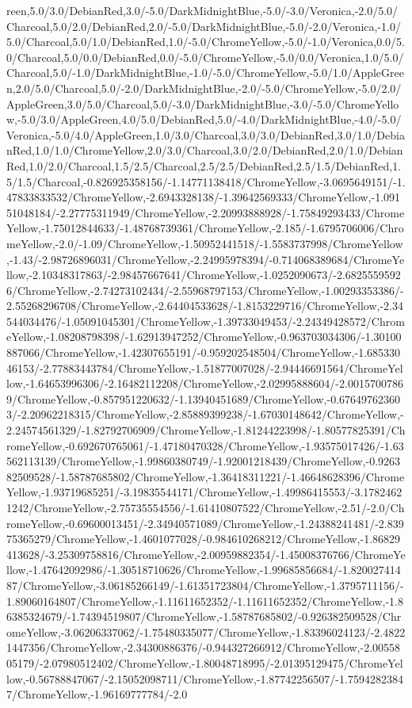 {\begin{tikzternal}
reen,5.0/3.0/DebianRed,3.0/-5.0/DarkMidnightBlue,-5.0/-3.0/Veronica,-2.0/5.0/Charcoal,5.0/2.0/DebianRed,2.0/-5.0/DarkMidnightBlue,-5.0/-2.0/Veronica,-1.0/5.0/Charcoal,5.0/1.0/DebianRed,1.0/-5.0/ChromeYellow,-5.0/-1.0/Veronica,0.0/5.0/Charcoal,5.0/0.0/DebianRed,0.0/-5.0/ChromeYellow,-5.0/0.0/Veronica,1.0/5.0/Charcoal,5.0/-1.0/DarkMidnightBlue,-1.0/-5.0/ChromeYellow,-5.0/1.0/AppleGreen,2.0/5.0/Charcoal,5.0/-2.0/DarkMidnightBlue,-2.0/-5.0/ChromeYellow,-5.0/2.0/AppleGreen,3.0/5.0/Charcoal,5.0/-3.0/DarkMidnightBlue,-3.0/-5.0/ChromeYellow,-5.0/3.0/AppleGreen,4.0/5.0/DebianRed,5.0/-4.0/DarkMidnightBlue,-4.0/-5.0/Veronica,-5.0/4.0/AppleGreen,1.0/3.0/Charcoal,3.0/3.0/DebianRed,3.0/1.0/DebianRed,1.0/1.0/ChromeYellow,2.0/3.0/Charcoal,3.0/2.0/DebianRed,2.0/1.0/DebianRed,1.0/2.0/Charcoal,1.5/2.5/Charcoal,2.5/2.5/DebianRed,2.5/1.5/DebianRed,1.5/1.5/Charcoal,-0.826925358156/-1.14771138418/ChromeYellow,-3.0695649151/-1.47833833532/ChromeYellow,-2.6943328138/-1.39642569333/ChromeYellow,-1.09151048184/-2.27775311949/ChromeYellow,-2.20993888928/-1.75849293433/ChromeYellow,-1.75012844633/-1.48768739361/ChromeYellow,-2.185/-1.6795706006/ChromeYellow,-2.0/-1.09/ChromeYellow,-1.50952441518/-1.5583737998/ChromeYellow,-1.43/-2.98726896031/ChromeYellow,-2.24995978394/-0.714068389684/ChromeYellow,-2.10348317863/-2.98457667641/ChromeYellow,-1.0252090673/-2.68255595926/ChromeYellow,-2.74273102434/-2.55968797153/ChromeYellow,-1.00293353386/-2.55268296708/ChromeYellow,-2.64404533628/-1.8153229716/ChromeYellow,-2.34544034476/-1.05091045301/ChromeYellow,-1.39733049453/-2.24349428572/ChromeYellow,-1.08208798398/-1.62913947252/ChromeYellow,-0.963703034306/-1.30100887066/ChromeYellow,-1.42307655191/-0.959202548504/ChromeYellow,-1.68533046153/-2.77883443784/ChromeYellow,-1.51877007028/-2.94446691564/ChromeYellow,-1.64653996306/-2.16482112208/ChromeYellow,-2.02995888604/-2.00157007869/ChromeYellow,-0.857951220632/-1.13940451689/ChromeYellow,-0.676497623603/-2.20962218315/ChromeYellow,-2.85889399238/-1.67030148642/ChromeYellow,-2.24574561329/-1.82792706909/ChromeYellow,-1.81244223998/-1.80577825391/ChromeYellow,-0.692670765061/-1.47180470328/ChromeYellow,-1.93575017426/-1.63562113139/ChromeYellow,-1.99860380749/-1.92001218439/ChromeYellow,-0.926382509528/-1.58787685802/ChromeYellow,-1.36418311221/-1.46648628396/ChromeYellow,-1.93719685251/-3.19835544171/ChromeYellow,-1.49986415553/-3.17824621242/ChromeYellow,-2.75735554556/-1.61410807522/ChromeYellow,-2.51/-2.0/ChromeYellow,-0.69600013451/-2.34940571089/ChromeYellow,-1.24388241481/-2.83975365279/ChromeYellow,-1.4601077028/-0.984610268212/ChromeYellow,-1.86829413628/-3.25309758816/ChromeYellow,-2.00959882354/-1.45008376766/ChromeYellow,-1.47642092986/-1.30518710626/ChromeYellow,-1.99685856684/-1.82002741487/ChromeYellow,-3.06185266149/-1.61351723804/ChromeYellow,-1.3795711156/-1.89060164807/ChromeYellow,-1.11611652352/-1.11611652352/ChromeYellow,-1.86385324679/-1.74394519807/ChromeYellow,-1.58787685802/-0.926382509528/ChromeYellow,-3.06206337062/-1.75480335077/ChromeYellow,-1.83396024123/-2.48221447356/ChromeYellow,-2.34300886376/-0.944327266912/ChromeYellow,-2.0055805179/-2.07980512402/ChromeYellow,-1.80048718995/-2.01395129475/ChromeYellow,-0.56788847067/-2.15052098711/ChromeYellow,-1.87742256507/-1.75942823847/ChromeYellow,-1.96169777784/-2.0
\end{tikzternal}}
